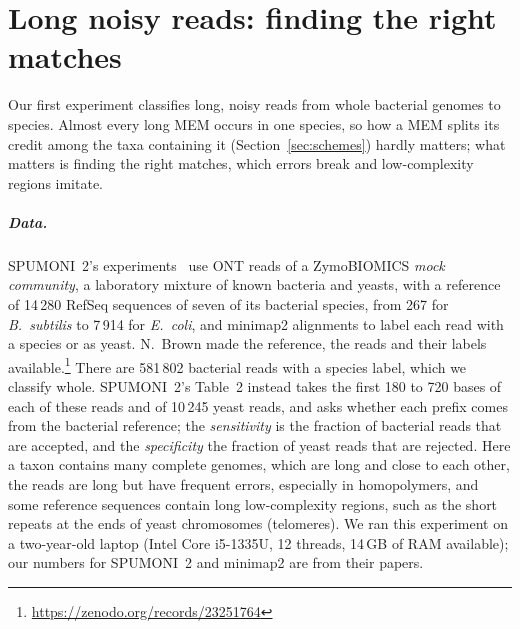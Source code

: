 \section{Long noisy reads: finding the right matches}
\label{sec:zymo}
\label{sec:regimes}
\label{sec:setup}

Our first experiment classifies long, noisy reads from whole bacterial genomes to species.
Almost every long MEM occurs in one species, so how a MEM splits its credit among the taxa containing it (Section~\ref{sec:schemes}) hardly matters; what matters is finding the right matches, which errors break and low-complexity regions imitate.

\subparagraph*{Data.}
SPUMONI~2's experiments~\cite{AhmedEtAl2023} use ONT reads of a ZymoBIOMICS \emph{mock community}, a laboratory mixture of known bacteria and yeasts, with a reference of 14\,280 RefSeq sequences of seven of its bacterial species, from 267 for \emph{B.~subtilis} to 7\,914 for \emph{E.~coli}, and minimap2 alignments to label each read with a species or as yeast.
N.~Brown made the reference, the reads and their labels available.\footnote{\url{https://zenodo.org/records/23251764}}
There are 581\,802 bacterial reads with a species label, which we classify whole.
SPUMONI~2's Table~2 instead takes the first 180 to 720 bases of each of these reads and of 10\,245 yeast reads, and asks whether each prefix comes from the bacterial reference; the \emph{sensitivity} is the fraction of bacterial reads that are accepted, and the \emph{specificity} the fraction of yeast reads that are rejected.
Here a taxon contains many complete genomes, which are long and close to each other, the reads are long but have frequent errors, especially in homopolymers, and some reference sequences contain long low-complexity regions, such as the short repeats at the ends of yeast chromosomes (telomeres).
We ran this experiment on a two-year-old laptop (Intel Core i5-1335U, 12 threads, 14\,GB of RAM available); our numbers for SPUMONI~2 and minimap2 are from their papers.

